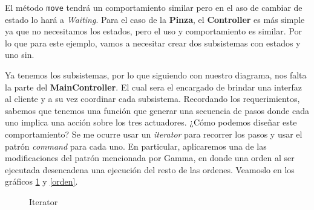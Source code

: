 El método \verb|move| tendrá un comportamiento similar pero en el aso de cambiar de estado lo hará a \textit{Waiting}. Para el caso de la \textbf{Pinza}, el \textbf{Controller} es más simple ya que no necesitamos los estados, pero el uso y comportamiento es similar. Por lo que para este ejemplo, vamos a necesitar crear dos subsistemas con estados y uno sin.

Ya tenemos los subsistemas, por lo que siguiendo con nuestro diagrama, nos falta la parte del \textbf{MainController}. El cual sera el encargado de brindar una interfaz al cliente y a su vez coordinar cada subsistema. Recordando los requerimientos, sabemos que tenemos una función que generar una secuencia de pasos donde cada uno implica una acción sobre los tres actuadores. ¿Cómo podemos diseñar este comportamiento? Se me ocurre usar un \textit{iterator} para recorrer los pasos y usar el patrón \textit{command} para cada uno. En particular, aplicaremos una de las modificaciones del patrón mencionada por Gamma\cite{Gamma:1995:DPE:186897}, en donde una orden al ser ejecutada desencadena una ejecución del resto de las ordenes. Veamoslo en los gráficos \ref{iterator} y \ref{orden}.


\begin{figure}[h]
\caption{Iterator}
\label{iterator}
\begin{center}
\end{center}
\end{figure}

